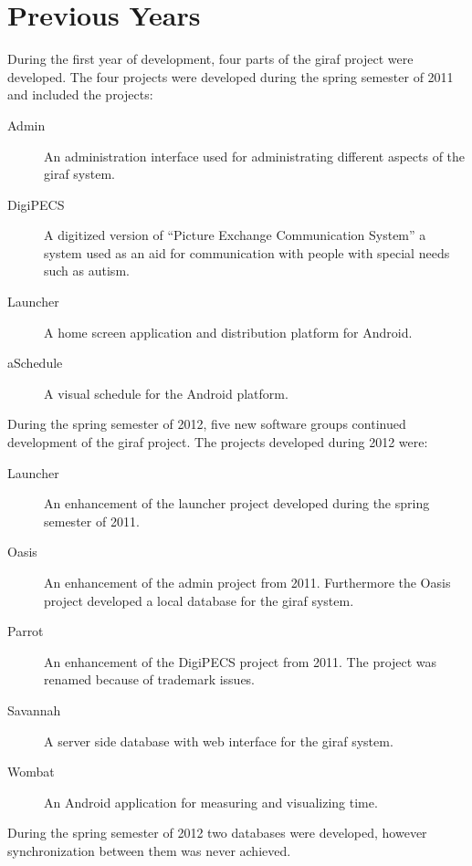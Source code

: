\section{Previous Years}

During the first year of development, four parts of the \ac{giraf} project were developed. The four projects were developed during the spring semester of 2011 and included the projects:
\begin{description}
\item [Admin] An administration interface used for administrating different aspects of the \ac{giraf} system.
\item [DigiPECS] A digitized version of ``Picture Exchange Communication System''\cite{pecs} a system used as an aid for communication with people with special needs such as autism.
\item [Launcher] A home screen application and distribution platform for Android.
\item [aSchedule] A visual schedule for the Android platform.
\end{description}

During the spring semester of 2012, five new software groups continued development of the \ac{giraf} project. The projects developed during 2012 were:

\begin{description}
\item [Launcher] An enhancement of the launcher project developed during the spring semester of 2011.
\item [Oasis] An enhancement of the admin project from 2011. Furthermore the Oasis project developed a local database for the \ac{giraf} system.
\item [Parrot] An enhancement of the DigiPECS project from 2011. The project was renamed because of trademark issues.
\item [Savannah] A server side database with web interface for the \ac{giraf} system.
\item [Wombat] An Android application for measuring and visualizing time.
\end{description}

During the spring semester of 2012 two databases were developed, however synchronization between them was never achieved.

